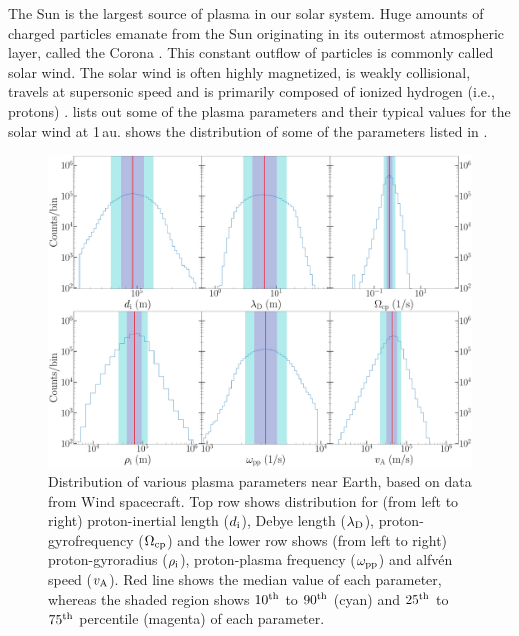         The Sun is the largest source of plasma in our solar system. Huge amounts of charged
        particles emanate from the Sun originating in its outermost atmospheric layer, called the
        Corona \citep{Parker1958,Parker1960,Parker1963,Gringauz1960,Neugebauer1962}. This constant
        outflow of particles is commonly called solar wind. The solar wind is often highly
        magnetized, is weakly collisional, travels at supersonic speed and is primarily composed of
        ionized hydrogen (i.e., protons) \citep{Marsch1982}.  lists out some of
        the plasma parameters and their typical values for the solar wind at 1\,au.
         shows the distribution of some of the parameters listed in
        .
        \begin{figure}
            \begin{center}
                \includegraphics[width=1\textwidth]{figures/chap1/plasma_parameters_wnd.pdf}
                \caption[Plasma parameter distributions at 1\,au ]{Distribution of various plasma
                parameters near Earth, based on data from Wind spacecraft. Top row shows
                distribution for (from left to right) proton-inertial length ($d_{\rm i}$), Debye
                length ($\lambda_{\rm D}$), proton-gyrofrequency ($\Omega_{\rm cp}$) and the lower
                row shows (from left to right) proton-gyroradius ($\rho_{\rm i}$), proton-plasma
                frequency ($\omega_{\rm pp}$) and alfv\'en speed ($v_{\rm A}$). Red line shows the
                median value of each parameter, whereas the shaded region shows $10^{\rm th}$ to
                $90^{\rm th}$ (cyan) and $25^{\rm th}$ to $75^{\rm th}$ percentile (magenta) of each
                parameter.\protect\footnotemark}
                \label{fig:plas_para_wnd}
            \end{center}
        \end{figure}

